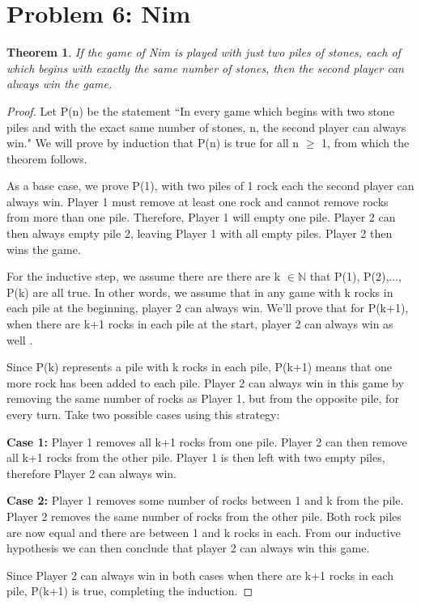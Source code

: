 \documentclass[10pt,letter]{article}
\newtheorem*{thm}{Theorem}
\begin{document}
\section*{Problem 6: Nim}
\begin{thm}
If the game of Nim  is played with just two piles of stones, each of which begins with exactly the same number of stones, then the second player can always win the game. 
\end{thm}
\begin{proof}
Let P(n) be the statement ``In every game which begins with two stone piles and with the exact same number of stones, n, the second player can always win." We will prove by induction that P(n) is true for all n $\geq$ 1, from which the theorem follows.

As a base case, we prove P(1), with two piles of 1 rock each the second player can always win. Player 1 must remove at least one rock and cannot remove rocks from more than one pile. Therefore, Player 1 will empty one pile. Player 2 can then always empty pile 2, leaving Player 1 with all empty piles. Player 2 then wins the game. 

For the inductive step, we assume there are there are k  $\in \mathbb{N}$ that P(1), P(2),..., P(k) are all true. In other words, we assume that in any game with k rocks in each pile at the beginning, player 2 can always win. We'll prove that for P(k+1), when there are k+1 rocks in each pile at the start, player 2 can always win as well . 

Since P(k) represents a pile with k rocks in each pile, P(k+1) means that one more rock has been added to each pile. Player 2 can always win in this game by removing the same number of rocks as Player 1, but from the opposite pile, for every turn. Take two possible cases using this strategy:

\textbf{Case 1:} Player 1 removes all k+1 rocks from one pile. Player 2 can then remove all k+1 rocks from the other pile. Player 1 is then left with two empty piles, therefore Player 2 can always win. 

\textbf{Case 2:} Player 1 removes some number of rocks between 1 and k from the pile. Player 2 removes the same number of rocks from the other pile. Both rock piles are now equal and there are between 1 and k rocks in each. 
From our inductive hypothesis we can then conclude that player 2 can always win this game. 

Since Player 2 can always win in both cases when there are k+1 rocks in each pile, P(k+1) is true, completing the induction. 
\end{proof}
\end{document}
